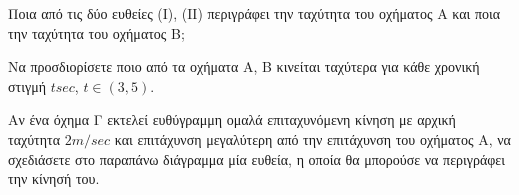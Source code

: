 \begin{alist}
\begin{rlist}
\item Ποια από τις δύο ευθείες (Ι), (ΙΙ) περιγράφει την ταχύτητα του οχήματος Α και ποια την ταχύτητα του οχήματος Β;

\item Να προσδιορίσετε ποιο από τα οχήματα Α, Β κινείται ταχύτερα για κάθε χρονική στιγμή $t \si{sec}$, $t \in (3,5)$.
\item Αν ένα όχημα Γ εκτελεί ευθύγραμμη ομαλά επιταχυνόμενη κίνηση με αρχική ταχύτητα $2 \si{m/sec}$ και επιτάχυνση μεγαλύτερη από την επιτάχυνση του οχήματος Α, να σχεδιάσετε στο παραπάνω διάγραμμα μία ευθεία, η οποία θα μπορούσε να περιγράφει την κίνησή του.
\end{rlist}
\end{alist}

